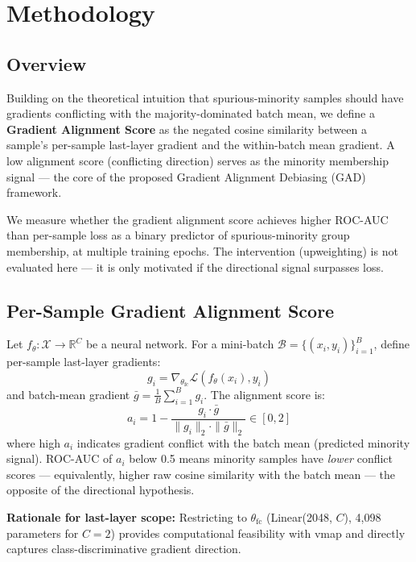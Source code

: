 \section{Methodology}
\label{sec:methodology}

\subsection{Overview}

Building on the theoretical intuition that spurious-minority samples should have gradients conflicting with the majority-dominated batch mean, we define a \textbf{Gradient Alignment Score} as the negated cosine similarity between a sample's per-sample last-layer gradient and the within-batch mean gradient.
A low alignment score (conflicting direction) serves as the minority membership signal --- the core of the proposed Gradient Alignment Debiasing (GAD) framework.

We measure whether the gradient alignment score achieves higher ROC-AUC than per-sample loss as a binary predictor of spurious-minority group membership, at multiple training epochs.
The intervention (upweighting) is not evaluated here --- it is only motivated if the directional signal surpasses loss.

\subsection{Per-Sample Gradient Alignment Score}

Let $f_\theta: \mathcal{X} \to \mathbb{R}^C$ be a neural network.
For a mini-batch $\mathcal{B} = \{(x_i, y_i)\}_{i=1}^{B}$, define per-sample last-layer gradients:
\begin{equation}
  g_i = \nabla_{\theta_{\text{fc}}} \mathcal{L}(f_\theta(x_i), y_i)
\end{equation}
and batch-mean gradient $\bar{g} = \frac{1}{B} \sum_{i=1}^{B} g_i$.
The alignment score is:
\begin{equation}
  a_i = 1 - \frac{g_i \cdot \bar{g}}{\|g_i\|_2 \cdot \|\bar{g}\|_2} \in [0, 2]
\end{equation}
where high $a_i$ indicates gradient conflict with the batch mean (predicted minority signal).
ROC-AUC of $a_i$ below 0.5 means minority samples have \emph{lower} conflict scores --- equivalently, higher raw cosine similarity with the batch mean --- the opposite of the directional hypothesis.

\textbf{Rationale for last-layer scope:} Restricting to $\theta_{\text{fc}}$ (Linear(2048, $C$), 4,098 parameters for $C=2$) provides computational feasibility with vmap and directly captures class-discriminative gradient direction.

